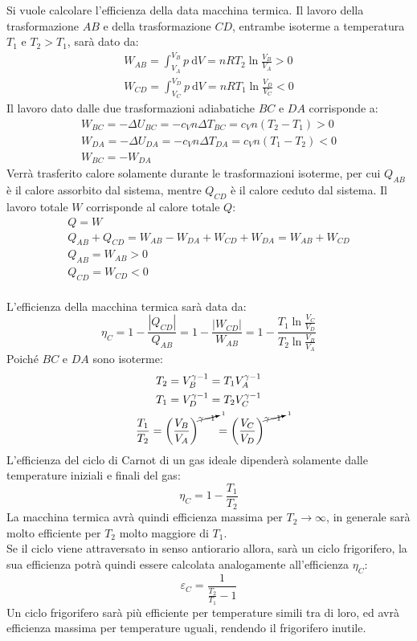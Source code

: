 \documentclass{article}
\newcommand{\df}{\mathrm{d}}
\numberwithin{equation}{subsection}
\begin{document}
Si vuole calcolare l'efficienza della data macchina termica. Il 
lavoro della trasformazione $AB$ e della trasformazione $CD$, entrambe isoterme a temperatura $T_1$ e $T_2>T_1$, sarà dato da: 
\begin{gather*}
    W_{AB}=\int_{V_A}^{V_B}p\:\df V=nRT_2\ln\displaystyle\frac{V_B}{V_A}>0\\
    W_{CD}=\int_{V_C}^{V_D}p\:\df V=nRT_1\ln\displaystyle\frac{V_D}{V_C}<0
\end{gather*}
Il lavoro dato dalle due trasformazioni adiabatiche $BC$ e $DA$ corrisponde a:
\begin{gather*}
    W_{BC}=-\Delta U_{BC}=-c_Vn\Delta T_{BC}=c_Vn(T_2-T_1)>0\\
    W_{DA}=-\Delta U_{DA}=-c_Vn\Delta T_{DA}=c_Vn(T_1-T_2)<0\\
    W_{BC}=-W_{DA}
\end{gather*}
Verrà trasferito calore solamente durante le trasformazioni isoterme, per cui 
$Q_{AB}$ è il calore assorbito dal sistema, mentre $Q_{CD}$ è il calore 
ceduto dal sistema. Il lavoro totale $W$ corrisponde al calore totale $Q$:
\begin{gather*}
    Q=W\\
    Q_{AB}+Q_{CD}=W_{AB}-W_{DA}+W_{CD}+W_{DA}=W_{AB}+W_{CD}\\
    Q_{AB}=W_{AB}>0\\
    Q_{CD}=W_{CD}<0
\end{gather*}
\\
L'efficienza della macchina termica sarà data da:
\begin{equation*}
    \eta_C=1-\displaystyle\frac{|Q_{CD}|}{Q_{AB}}=1-\frac{|W_{CD}|}{W_{AB}}=1-\frac{T_1\ln\displaystyle\frac{V_C}{V_D}}{T_2\ln\displaystyle\frac{V_B}{V_A}}
\end{equation*}
Poiché $BC$ e $DA$ sono isoterme:
\begin{gather*}
    T_2=V_B^{\gamma-1}=T_1V_A^{\gamma-1}\\
    T_1=V_D^{\gamma-1}=T_2V_C^{\gamma-1}\\
    \displaystyle\frac{T_1}{T_2}=\left(\frac{V_B}{V_A}\right)^{\cancelto{1}{\gamma-1}}=\left(\frac{V_C}{V_D}\right)^{\cancelto{1}{\gamma-1}}
\end{gather*}
L'efficienza del ciclo di Carnot di un gas ideale dipenderà solamente dalle temperature iniziali e finali del gas:
\begin{equation}
    \eta_C=1-\displaystyle\frac{T_1}{T_2}
\end{equation}
La macchina termica avrà quindi efficienza massima per $T_2\to\infty$, 
in generale sarà molto efficiente per $T_2$ molto maggiore di $T_1$.
\\
Se il ciclo viene attraversato in senso antiorario allora, sarà un ciclo 
frigorifero, la sua efficienza potrà quindi essere calcolata 
analogamente all'efficienza $\eta_C$:
\begin{equation}
    \varepsilon_C=\displaystyle\frac{1}{\displaystyle\frac{T_2}{T_1}-1}
\end{equation}
Un ciclo frigorifero sarà più efficiente per temperature simili tra di loro, 
ed avrà efficienza massima per temperature uguali, rendendo il frigorifero 
inutile. 
\end{document}
